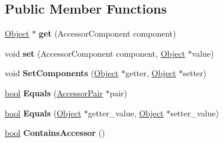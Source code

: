 \subsection*{Public Member Functions}
\begin{DoxyCompactItemize}
\item 
\mbox{\label{classv8_1_1internal_1_1AccessorPair_a66569cd687b684427f0d9d34514858a6}} 
\mbox{\hyperlink{classv8_1_1internal_1_1Object}{Object}} $\ast$ {\bfseries get} (Accessor\+Component component)
\item 
\mbox{\label{classv8_1_1internal_1_1AccessorPair_ad2a9c19f26306e325c88a48431f1f2c1}} 
void {\bfseries set} (Accessor\+Component component, \mbox{\hyperlink{classv8_1_1internal_1_1Object}{Object}} $\ast$value)
\item 
\mbox{\label{classv8_1_1internal_1_1AccessorPair_a6e5a2de9676c59e75ff73635f152a27d}} 
void {\bfseries Set\+Components} (\mbox{\hyperlink{classv8_1_1internal_1_1Object}{Object}} $\ast$getter, \mbox{\hyperlink{classv8_1_1internal_1_1Object}{Object}} $\ast$setter)
\item 
\mbox{\label{classv8_1_1internal_1_1AccessorPair_a074f0577eb38b61f347071f85120339b}} 
\mbox{\hyperlink{classbool}{bool}} {\bfseries Equals} (\mbox{\hyperlink{classv8_1_1internal_1_1AccessorPair}{Accessor\+Pair}} $\ast$pair)
\item 
\mbox{\label{classv8_1_1internal_1_1AccessorPair_aeb0ab989aa8c299311ea5ad17c496732}} 
\mbox{\hyperlink{classbool}{bool}} {\bfseries Equals} (\mbox{\hyperlink{classv8_1_1internal_1_1Object}{Object}} $\ast$getter\+\_\+value, \mbox{\hyperlink{classv8_1_1internal_1_1Object}{Object}} $\ast$setter\+\_\+value)
\item 
\mbox{\label{classv8_1_1internal_1_1AccessorPair_a3776e1f65c6612d9cb544747211bd3f0}} 
\mbox{\hyperlink{classbool}{bool}} {\bfseries Contains\+Accessor} ()
\end{DoxyCompactItemize}
